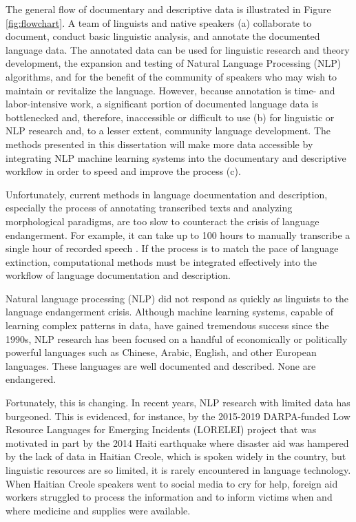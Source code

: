 The general flow of documentary and descriptive data is illustrated in Figure \ref{fig:flowchart}. A team of linguists and native speakers (a) collaborate to document, conduct basic linguistic analysis, and annotate the documented language data. The annotated data can be used for linguistic research and theory development, the expansion and testing of Natural Language Processing (NLP) algorithms, and for the benefit of the community of speakers who may wish to maintain or revitalize the language. However, because annotation is time- and labor-intensive work, a significant portion of documented language data is bottlenecked and, therefore, inaccessible or difficult to use (b) for linguistic or NLP research and, to a lesser extent, community language development. The methods presented in this dissertation will make more data accessible by integrating NLP machine learning systems into the documentary and descriptive workflow in order to speed and improve the process (c).

Unfortunately, current methods in language documentation and description, especially the process of annotating transcribed texts and analyzing morphological paradigms, are too slow to counteract the crisis of language endangerment. For example, it can take up to 100 hours to manually transcribe a single hour of recorded speech \citep{seifart_language_2018}.
If the process is to match the pace of language extinction, computational methods must be integrated effectively into the workflow of language documentation and description. 

Natural language processing (NLP) did not respond as quickly as linguists to the language endangerment crisis. Although machine learning systems, capable of learning complex patterns in data, have gained tremendous success since the 1990s, NLP research has been focused on a handful of economically or politically powerful languages such as Chinese, Arabic, English, and other European languages. These languages are well documented and described. None 
are endangered.

Fortunately, this is changing. In recent years, NLP research with limited data has burgeoned. This is evidenced, for instance, by the 2015-2019 DARPA-funded Low Resource Languages for Emerging Incidents (LORELEI) project that was motivated in part by the 2014 Haiti earthquake where disaster aid was hampered by the lack of data in Haitian Creole, which is spoken widely in the country, but linguistic resources are so limited, it is rarely encountered in language technology. When Haitian Creole speakers went to social media to cry for help, foreign aid workers struggled to process the information and to inform victims when and where medicine and supplies were available.

